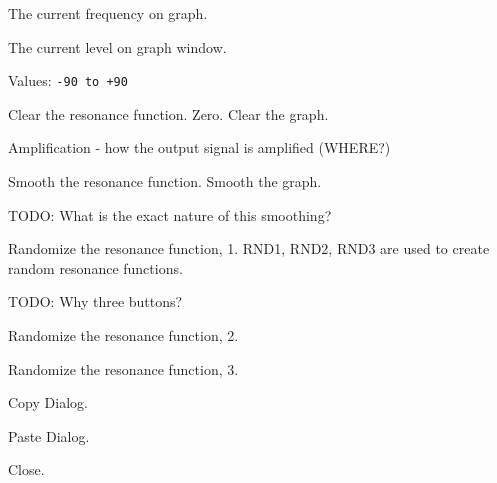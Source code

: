    The current frequency on graph.

   The current level on graph window.

   Values: \texttt{-90 to +90}

   Clear the resonance function.
   Zero. Clear the graph.

   Amplification - how the output signal is amplified (WHERE?)

   Smooth the resonance function.
   Smooth the graph.

   TODO:  What is the exact nature of this smoothing?

   Randomize the resonance function, 1.
   RND1, RND2, RND3 are used to create random resonance functions.

   TODO:  Why three buttons?


   Randomize the resonance function, 2.

   Randomize the resonance function, 3.

   Copy Dialog.

   Paste Dialog.

   Close.

